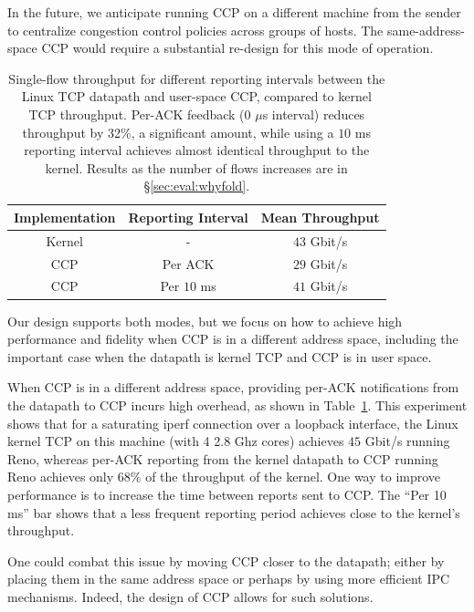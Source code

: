  In the future, we anticipate running CCP on a different machine from the sender to centralize congestion control policies across groups of hosts. 
The same-address-space CCP would require a substantial re-design for this mode of operation.

\begin{table}[]
    \centering
    \begin{tabular}{c|c|c}
        Implementation & Reporting Interval & Mean Throughput \\
        \hline
        Kernel & - & $43$ Gbit/s \\
        CCP & Per ACK & $29$ Gbit/s \\
        CCP & Per $10$ ms & $41$ Gbit/s \\
    \end{tabular}
    \caption{Single-flow throughput for different reporting intervals between the Linux TCP datapath and user-space CCP, compared to kernel TCP throughput. Per-ACK feedback (0 $\mu$s interval) reduces throughput by 32\%, a significant amount, while using a $10$ ms reporting interval achieves almost identical throughput to the kernel. Results as the number of flows  increases are in \S\ref{sec:eval:whyfold}.}\label{fig:perf:interval}
\end{table}

\smallskip

Our design supports both modes, but we focus on how to achieve high performance and fidelity when CCP is in a different address space, including the important case when the datapath is kernel TCP and CCP is in user space.

When CCP is in a different address space, providing per-ACK notifications from the datapath to CCP incurs high overhead, as shown in Table~\ref{fig:perf:interval}. This experiment shows that for a saturating iperf connection over a loopback interface, the Linux kernel TCP on this machine  (with 4 2.8 Ghz cores) achieves $45$ Gbit/s running Reno, whereas per-ACK reporting from the kernel datapath to CCP running Reno achieves only 68\% of the throughput of the kernel. 
One way to improve performance is to increase the time between reports sent to CCP. The ``Per 10 ms'' bar shows that a less frequent reporting period achieves close to the kernel's throughput. 

One could combat this issue by moving CCP closer to the datapath; \ie either by placing them in the same address space or perhaps by using more efficient IPC mechanisms. Indeed, the design of CCP allows for such solutions. 


